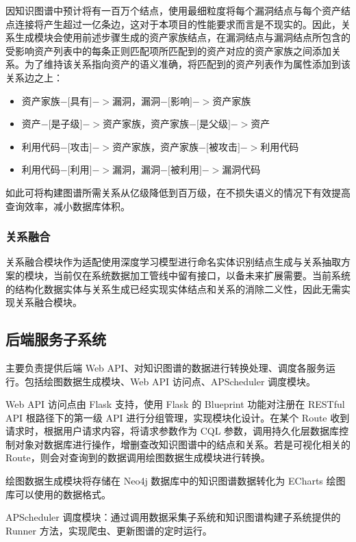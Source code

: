 \documentclass[a4paper,AutoFakeBold,oneside,12pt]{book}
\begin{document}
因知识图谱中预计将有一百万个结点，使用最细粒度将每个漏洞结点与每个资产结点连接将产生超过一亿条边，这对于本项目的性能要求而言是不现实的。因此，关系生成模块会使用前述步骤生成的资产家族结点，在漏洞结点与漏洞结点所包含的受影响资产列表中的每条正则匹配项所匹配到的资产对应的资产家族之间添加关系。为了维持该关系指向资产的语义准确，将匹配到的资产列表作为属性添加到该关系边之上：
\begin{itemize}
	\item 资产家族$-[$具有$]->$漏洞，漏洞$-[$影响$]->$资产家族
	\item 资产$-[$是子级$]->$资产家族，资产家族$-[$是父级$]->$资产
	\item 利用代码$-[$攻击$]->$资产家族，资产家族$-[$被攻击$]->$利用代码
	\item 利用代码$-[$利用$]->$漏洞，漏洞$-[$被利用$]->$漏洞代码
\end{itemize}

如此可将构建图谱所需关系从亿级降低到百万级，在不损失语义的情况下有效提高查询效率，减小数据库体积。

\subsubsection{关系融合}

关系融合模块作为适配使用深度学习模型进行命名实体识别结点生成与关系抽取方案的模块，当前仅在系统数据加工管线中留有接口，以备未来扩展需要。当前系统的结构化数据实体与关系生成已经实现实体结点和关系的消除二义性，因此无需实现关系融合模块。

\subsection{后端服务子系统}

主要负责提供后端 Web API、对知识图谱的数据进行转换处理、调度各服务运行。包括绘图数据生成模块、Web API 访问点、APScheduler 调度模块。

Web API 访问点由 Flask 支持，使用 Flask 的 Blueprint 功能对注册在 RESTful API 根路径下的第一级 API 进行分组管理，实现模块化设计。在某个 Route 收到请求时，根据用户请求内容，将请求参数作为 CQL 参数，调用持久化层数据库控制对象对数据库进行操作，增删查改知识图谱中的结点和关系。若是可视化相关的 Route，则会对查询到的数据调用绘图数据生成模块进行转换。

绘图数据生成模块将存储在 Neo4j 数据库中的知识图谱数据转化为 ECharts 绘图库可以使用的数据格式。

APScheduler 调度模块：通过调用数据采集子系统和知识图谱构建子系统提供的 Runner 方法，实现爬虫、更新图谱的定时运行。
\end{document}

